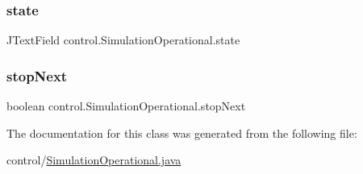 \subsubsection{\texorpdfstring{state}{state}}
{\footnotesize\ttfamily J\+Text\+Field control.\+Simulation\+Operational.\+state\hspace{0.3cm}{\ttfamily [private]}}

\mbox{\label{classcontrol_1_1_simulation_operational_acda8346b0a85916ca536b13bcb704b33}} 
\subsubsection{\texorpdfstring{stopNext}{stopNext}}
{\footnotesize\ttfamily boolean control.\+Simulation\+Operational.\+stop\+Next\hspace{0.3cm}{\ttfamily [private]}}



The documentation for this class was generated from the following file\+:\begin{DoxyCompactItemize}
\item 
control/\mbox{\hyperlink{_simulation_operational_8java}{Simulation\+Operational.\+java}}\end{DoxyCompactItemize}
